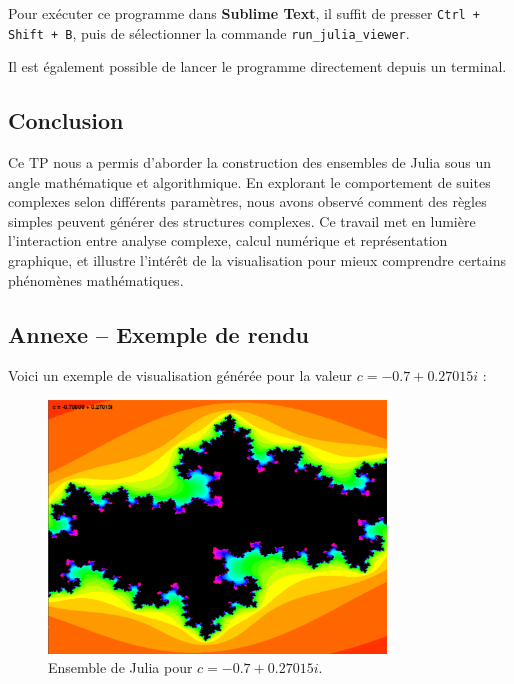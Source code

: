 \documentclass[a4paper,12pt]{article}
\begin{document}
Pour exécuter ce programme dans \textbf{Sublime Text}, il suffit de presser \texttt{Ctrl + Shift + B}, puis de sélectionner la commande \texttt{run\_julia\_viewer}.

Il est également possible de lancer le programme directement depuis un terminal.

\subsection*{Conclusion}

Ce TP nous a permis d’aborder la construction des ensembles de Julia sous un angle mathématique et algorithmique. En explorant le comportement de suites complexes selon différents paramètres, nous avons observé comment des règles simples peuvent générer des structures complexes. Ce travail met en lumière l’interaction entre analyse complexe, calcul numérique et représentation graphique, et illustre l’intérêt de la visualisation pour mieux comprendre certains phénomènes mathématiques.

\clearpage

\subsection*{Annexe – Exemple de rendu}

Voici un exemple de visualisation générée pour la valeur \( c = -0.7 + 0.27015i \) :

\begin{figure}[h]
    \centering
    \includegraphics[width=0.8\textwidth]{julia_set_example.png}
    \caption{Ensemble de Julia pour \( c = -0.7 + 0.27015i \).}
    \label{fig:julia_set}
\end{figure}
\end{document}
